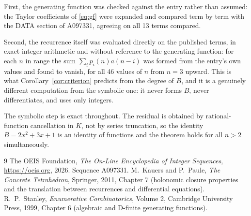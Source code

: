\documentclass[11pt,a4paper]{article}
\theoremstyle{plain}
\theoremstyle{definition}
\begin{document}
First, the generating function was checked against the entry rather than assumed: the
Taylor coefficients of \eqref{eq:gf} were expanded and compared term by term with the DATA
section of A097331, agreeing on all 13 terms compared.

Second, the recurrence itself was evaluated directly on the published terms, in exact
integer arithmetic and without reference to the generating function: for each $n$ in range
the sum $\sum_{i}p_{i}(n)a(n-i)$ was formed from the entry's own values and found to
vanish, for all 46 values of $n$ from $n=3$ upward. This is what
Corollary~\ref{cor:criterion} predicts from the degree of $B$, and it is a genuinely
different computation from the symbolic one: it never forms $B$, never differentiates, and
uses only integers.

The symbolic step is exact throughout. The residual is obtained by rational-function
cancellation in $K$, not by series truncation, so the identity $B=2 x^{2} + 3 x + 1$ is an
identity of functions and the theorem holds for all $n>2$ simultaneously.

\begin{thebibliography}{9}
 The OEIS Foundation, \emph{The On-Line Encyclopedia of Integer Sequences},
\url{https://oeis.org}, 2026. Sequence A097331.
 M.~Kauers and P.~Paule, \emph{The Concrete Tetrahedron}, Springer, 2011,
Chapter 7 (holonomic closure properties and the translation between recurrences and
differential equations).
 R.~P.~Stanley, \emph{Enumerative Combinatorics}, Volume 2, Cambridge
University Press, 1999, Chapter 6 (algebraic and D-finite generating functions).
\end{thebibliography}
\end{document}
